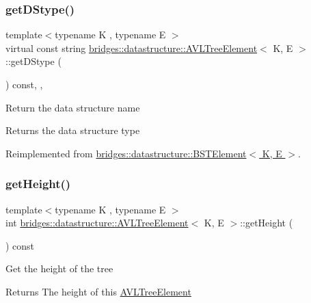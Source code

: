 \subsubsection{\texorpdfstring{get\+D\+Stype()}{getDStype()}}
{\footnotesize\ttfamily template$<$typename K , typename E $>$ \\
virtual const string \hyperlink{classbridges_1_1datastructure_1_1_a_v_l_tree_element}{bridges\+::datastructure\+::\+A\+V\+L\+Tree\+Element}$<$ K, E $>$\+::get\+D\+Stype (\begin{DoxyParamCaption}{ }\end{DoxyParamCaption}) const\hspace{0.3cm}{\ttfamily [inline]}, {\ttfamily [override]}, {\ttfamily [virtual]}}

Return the data structure name \begin{DoxyReturn}{Returns}
the data structure type 
\end{DoxyReturn}


Reimplemented from \hyperlink{classbridges_1_1datastructure_1_1_b_s_t_element_a2bb8cc9ec4b6bc5b89ecef0f17be366f}{bridges\+::datastructure\+::\+B\+S\+T\+Element$<$ K, E $>$}.

\mbox{\label{classbridges_1_1datastructure_1_1_a_v_l_tree_element_a5d4b990d49f6f3d2f23f4dd3e57414e8}} 
\subsubsection{\texorpdfstring{get\+Height()}{getHeight()}}
{\footnotesize\ttfamily template$<$typename K , typename E $>$ \\
int \hyperlink{classbridges_1_1datastructure_1_1_a_v_l_tree_element}{bridges\+::datastructure\+::\+A\+V\+L\+Tree\+Element}$<$ K, E $>$\+::get\+Height (\begin{DoxyParamCaption}{ }\end{DoxyParamCaption}) const\hspace{0.3cm}{\ttfamily [inline]}}

Get the height of the tree \begin{DoxyReturn}{Returns}
The height of this \hyperlink{classbridges_1_1datastructure_1_1_a_v_l_tree_element}{A\+V\+L\+Tree\+Element} 
\end{DoxyReturn}
\mbox{\label{classbridges_1_1datastructure_1_1_a_v_l_tree_element_ab05925e343b9fa71b61c71e8034e1293}} 
